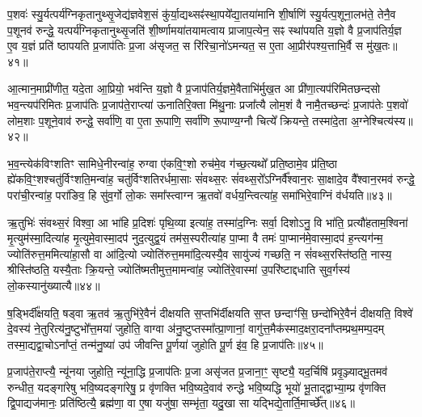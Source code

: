 प॒शवः॑ स्यु॒र्यत्पर्य॑ग्निकृतानुथ्सृ॒जेद्य॑ज्ञवेश॒सं कु॑र्या॒द्यथ्सꣴ॑स्था॒पये᳚द्या॒तया॑मानि शी॒र्\mbox{}षाणि॑ स्यु॒र्यत्प॒शूना॒लभ॑ते॒ तेनै॒व प॒शूनव॑ रुन्द्धे॒ यत्पर्य॑ग्निकृतानुथ्सृ॒जति॑ शी॒र्ष्णामया॑तयामत्वाय प्राजाप॒त्येन॒ सꣴ स्था॑पयति य॒ज्ञो वै प्र॒जाप॑तिर्य॒ज्ञ ए॒व य॒ज्ञं प्रति॑ ष्ठापयति प्र॒जाप॑तिः प्र॒जा अ॑सृजत॒ स रि॑रिचा॒नो॑\-ऽमन्यत॒ स ए॒ता आ॒प्रीर॑पश्य॒त्ताभि॒र्वै स मु॑ख॒तः॥४१॥

आ॒त्मान॒माप्री॑णीत॒ यदे॒ता आ॒प्रियो॒ भव॑न्ति य॒ज्ञो वै प्र॒जाप॑तिर्य॒ज्ञमे॒वैताभि॑र्मुख॒त आ प्री॑णा॒त्यप॑रिमितछन्दसो भव॒न्त्यप॑रिमितः प्र॒जाप॑तिः प्र॒जाप॑ते॒राप्त्या॑ ऊनातिरि॒क्ता मि॑थु॒नाः प्रजा᳚त्यै लोम॒शं वै नामै॒तच्छन्दः॑ प्र॒जाप॑तेः प॒शवो॑ लोम॒शाः प॒शूने॒वाव॑ रुन्द्धे॒ सर्वा॑णि॒ वा ए॒ता रू॒पाणि॒ सर्वा॑णि रू॒पाण्य॒ग्नौ चित्ये᳚ क्रियन्ते॒ तस्मा॑दे॒ता अ॒ग्नेश्चित्य॑स्य॥४२॥

भ॒व॒न्त्येक॑विꣳशतिꣳ सामिधे॒नीरन्वा॑ह॒ रुग्वा ए॑कवि॒ꣳ॒शो रुच॑मे॒व ग॑च्छ॒त्यथो᳚ प्रति॒ष्ठामे॒व प्र॑ति॒ष्ठा ह्ये॑कवि॒ꣳ॒शश्चतु॑र्विꣳशति॒मन्वा॑ह॒ चतु॑र्विꣳशतिरर्धमा॒साः सं॑वथ्स॒रः सं॑वथ्स॒रो᳚\-ऽग्निर्वै᳚श्वान॒रः सा॒क्षादे॒व वै᳚श्वान॒रमव॑ रुन्द्धे॒ परा॑ची॒रन्वा॑ह॒ परा॑ङिव॒ हि सु॑व॒र्गो लो॒कः समा᳚स्त्वाग्न ऋ॒तवो॑ वर्धय॒न्त्वित्या॑ह॒ समा॑भिरे॒वाग्निं व॑र्धयति॥४३॥

ऋ॒तुभिः॑ संवथ्स॒रं विश्वा॒ आ भा॑हि प्र॒दिशः॑ पृथि॒व्या इत्या॑ह॒ तस्मा॑द॒ग्निः सर्वा॒ दिशो\-ऽनु॒ वि भा॑ति॒ प्रत्यौ॑हताम॒श्विना॑ मृ॒त्युम॑स्मा॒दित्या॑ह मृ॒त्युमे॒वास्मा॒दप॑ नुद॒त्युद्व॒यं तम॑स॒स्परीत्या॑ह पा॒प्मा वै तमः॑ पा॒प्मान॑मे॒वास्मा॒दप॑ ह॒न्त्यग॑न्म॒ ज्योति॑रुत्त॒ममित्या॑हा॒सौ वा आ॑दि॒त्यो ज्योति॑रुत्त॒ममा॑दि॒त्यस्यै॒व सायु॑ज्यं गच्छति॒ न सं॑वथ्स॒रस्ति॑ष्ठति॒ नास्य॒ श्रीस्ति॑ष्ठति॒ यस्यै॒ताः क्रि॒यन्ते॒ ज्योति॑ष्मतीमुत्त॒मामन्वा॑ह॒ ज्योति॑रे॒वास्मा॑ उ॒परि॑ष्टाद्दधाति सुव॒र्गस्य॑ लो॒कस्यानु॑ख्यात्यै॥४४॥

{\anuvakamend[{याव॑न्तो\-ऽस्य मुख॒तश्चित्य॑स्य वर्धयत्यादि॒त्यो᳚\-ऽष्टाविꣳ॑शतिश्च॥८॥}]}

ष॒ड्भिर्दी᳚क्षयति॒ षड्वा ऋ॒तव॑ ऋ॒तुभि॑रे॒वैनं॑ दीक्षयति स॒प्तभि॑र्दीक्षयति स॒प्त छन्दाꣳ॑सि॒ छन्दो॑भिरे॒वैनं॑ दीक्षयति॒ विश्वे॑ दे॒वस्य॑ ने॒तुरित्य॑नु॒ष्टुभो᳚त्त॒मया॑ जुहोति॒ वाग्वा अ॑नु॒ष्टुप्तस्मा᳚त्प्रा॒णानां॒ वागु॑त्त॒मैक॑स्माद॒क्षरा॒दना᳚प्तम्प्रथ॒मम्प॒दम् तस्मा॒द्यद्वा॒चो\-ऽना᳚प्तं॒ तन्म॑नु॒ष्या॑ उप॑ जीवन्ति पू॒र्णया॑ जुहोति पू॒र्ण इ॑व॒ हि प्र॒जाप॑तिः॥४५॥

प्र॒जाप॑ते॒राप्त्यै॒ न्यू॑नया जुहोति॒ न्यू॑ना॒द्धि प्र॒जाप॑तिः प्र॒जा असृ॑जत प्र॒जाना॒ꣳ॒ सृष्ट्यै॒ यद॒र्चिषि॑ प्रवृ॒ञ्ज्याद्भू॒तमव॑ रुन्धीत॒ यदङ्गा॑रेषु भवि॒ष्यदङ्गा॑रेषु॒ प्र वृ॑णक्ति भवि॒ष्यदे॒वाव॑ रुन्द्धे भवि॒ष्यद्धि भूयो॑ भू॒ताद्द्वाभ्या॒म्प्र वृ॑णक्ति द्वि॒पाद्यज॑मानः॒ प्रति॑ष्ठित्यै॒ ब्रह्म॑णा॒ वा ए॒षा यजु॑षा॒ सम्भृ॑ता॒ यदु॒खा सा यद्भिद्ये॒तार्ति॒मार्च्छे᳚त्॥४६॥

